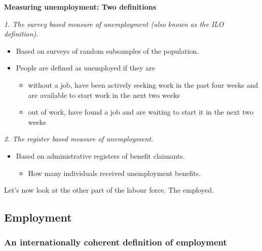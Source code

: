 \documentclass[
]{book}
\providecommand{\tightlist}{%
  \setlength{\itemsep}{0pt}\setlength{\parskip}{0pt}}
\begin{document}
\begin{myblock}
\textbf{Measuring unemployment: Two definitions}

\emph{1. The survey based measure of unemployment (also known as the ILO
definition).}

\begin{itemize}
\item
  Based on surveys of random subsamples of the population.
\item
  People are defined as unemployed if they are

  \begin{itemize}
  \tightlist
  \item
    without a job, have been actively seeking work in the past four
    weeks and are available to start work in the next two weeks
  \item
    out of work, have found a job and are waiting to start it in the
    next two weeks
  \end{itemize}
\end{itemize}

\emph{2. The register based measure of unemployment.}

\begin{itemize}
\tightlist
\item
  Based on administrative registers of benefit claimants.

  \begin{itemize}
  \tightlist
  \item
    How many individuals received unemployment benefits.
  \end{itemize}
\end{itemize}
\end{myblock}

Let's now look at the other part of the labour force. The employed.

\hypertarget{employment}{%
\subsection*{Employment}\label{employment}}

\hypertarget{an-internationally-coherent-definition-of-employment}{%
\subsubsection*{An internationally coherent definition of employment}\label{an-internationally-coherent-definition-of-employment}}
\end{document}
